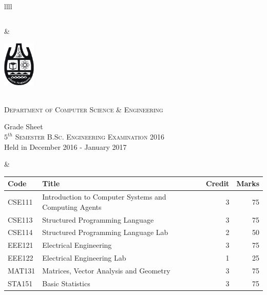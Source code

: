 \documentclass[11pt]{article}
\begin{document}
\begin{table}[ht]
\begin{tabularx}{\linewidth}{llll}
\begin{minipage}[m]{0.3\linewidth}
\begin{small}
{\begin{tabular}{ |c|}
			\end{tabular}
		}
	\end{small}
\end{minipage}

&
     \hspace{-5in}
\begin{minipage}[m]{0.35\textwidth} \centering
\includegraphics[width=0.6in]{cu-logo.jpg}
	
	\smallskip
	
	\\
	\textsc{Department of Computer Science \& Engineering}\\
	
	\smallskip
	
	{\large {\sc Grade Sheet}}\\
	
	\smallskip
	\textsc{$5^{th}$ Semester B.Sc. Engineering Examination 2016}\\
	{Held in December 2016 - January 2017}\\
\end{minipage}
&
\hspace{1cm}
\begin{minipage}[m]{0.3\linewidth} \flushright
	\hspace{-5cm}
	\begin{small}
		\renewcommand{\arraystretch}{1.01}
		\begin{tabular} {|l|l|r|r|}
			\hline \hline Code & Title  & Credit &  Marks \\ \hline
\hline  CSE111 & Introduction to Computer Systems and Computing Agents & 3 & 75  \\
\hline  CSE113 & Structured Programming Language & 3 & 75  \\
\hline  CSE114 & Structured Programming Language Lab & 2 & 50  \\
\hline  EEE121 & Electrical Engineering & 3 & 75  \\
\hline  EEE122 & Electrical Engineering Lab & 1 & 25  \\
\hline  MAT131 & Matrices, Vector Analysis and Geometry & 3 & 75  \\
\hline  STA151 & Basic Statistics & 3 & 75  \\
 \hline
		\end{tabular}
	\end{small} 
\end{minipage}

\end{tabularx}
\end{table}
\end{document}
